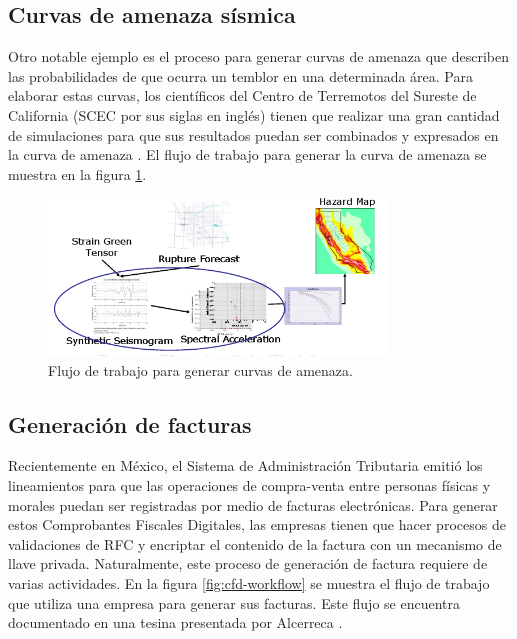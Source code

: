 \subsection{Curvas de amenaza sísmica}
Otro notable ejemplo es el proceso para generar curvas de amenaza que describen las probabilidades de que ocurra un temblor en una determinada área. Para elaborar estas curvas, los científicos del Centro de Terremotos del Sureste de California (SCEC por sus siglas en inglés) tienen que realizar una gran cantidad de simulaciones para que sus resultados puedan ser combinados y expresados en la curva de amenaza \cite{deelman2006managing}. El flujo de trabajo para generar la curva de amenaza se muestra en la figura \ref{fig:scec-workflow}.

\begin{figure}
    \begin{center}
        \includegraphics[width=0.8\textwidth]{imagenes/scec-workflow}
    \end{center}
    \caption{Flujo de trabajo para generar curvas de amenaza.}
    \label{fig:scec-workflow}
\end{figure}

\subsection{Generación de facturas}
Recientemente en México, el Sistema de Administración Tributaria emitió los lineamientos para que las operaciones de compra-venta entre personas físicas y morales puedan ser registradas por medio de facturas electrónicas. Para generar estos Comprobantes Fiscales Digitales, las empresas tienen que hacer procesos de validaciones de RFC y encriptar el contenido de la factura con un mecanismo de llave privada. Naturalmente, este proceso de generación de factura requiere de varias actividades. En la figura \ref{fig:cfd-workflow} se muestra el flujo de trabajo que utiliza una empresa para generar sus facturas. Este flujo se encuentra documentado en una tesina presentada por Alcerreca \cite{alcerreca2013cfd}.

